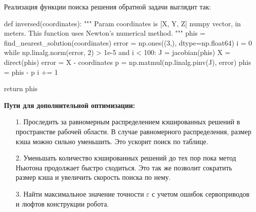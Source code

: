 \noindent Реализация функции поиска решения обратной задачи выглядит так:
\begin{python}
def inversed(coordinates):
    """ 
    Param coordinates is [X, Y, Z] numpy vector, in meters.
    This function uses Newton's numerical method.
    """
    phis = find_nearest_solution(coordinates)
    error = np.ones((3,), dtype=np.float64)
    i = 0
    while np.linalg.norm(error, 2) > 1e-5 and i < 100:
        J = jacobian(phis)
        X = direct(phis)
        error = X - coordinates
        p = np.matmul(np.linalg.pinv(J), error)
        phis = phis - p
        i += 1
    
    return phis
\end{python}

\textbf{Пути для дополнительной оптимизации:}
\begin{itemize}
    \item[1.] Проследить за равномерным распределением кэшированных решений в пространстве рабочей области. В случае равномерного распределения, размер кэша можно сильно уменьшить. Это ускорит поиск по таблице.
    \item[2.] Уменьшать количество кэшированных решений до тех пор пока метод Ньютона продолжает быстро сходиться. Это так же позволит сократить размер кэша и увеличить скорость поиска по нему.
    \item[3.] Найти максимальное значение точности $ \varepsilon $ с учетом ошибок сервоприводов и люфтов конструкции робота. 
\end{itemize}
